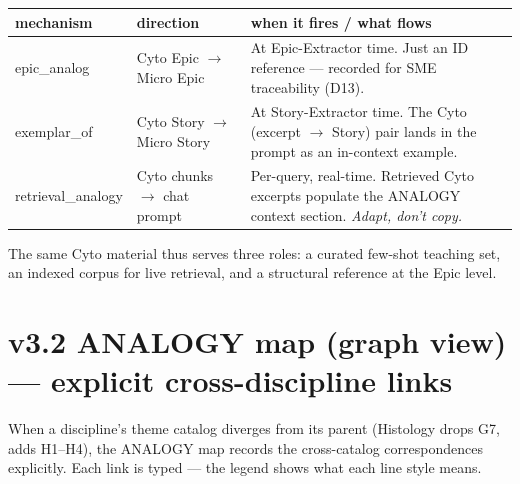 \documentclass[10pt,letterpaper]{article}
\begin{document}
\begin{tabularx}{\textwidth}{@{}>{\ttfamily}p{3.0cm}p{4.0cm}X@{}}
\toprule
\textbf{mechanism} & \textbf{direction} & \textbf{when it fires / what flows} \\
\midrule
epic\_analog & Cyto Epic $\rightarrow$ Micro Epic & At Epic-Extractor time. Just an ID reference --- recorded for SME traceability (D13). \\
exemplar\_of & Cyto Story $\rightarrow$ Micro Story & At Story-Extractor time. The Cyto (excerpt $\rightarrow$ Story) pair lands in the prompt as an in-context example. \\
retrieval\_analogy & Cyto chunks $\rightarrow$ chat prompt & Per-query, real-time. Retrieved Cyto excerpts populate the ANALOGY context section. \emph{Adapt, don't copy.} \\
\bottomrule
\end{tabularx}

The same Cyto material thus serves three roles: a curated few-shot teaching set, an indexed corpus for live retrieval, and a structural reference at the Epic level.

\section{v3.2 ANALOGY map (graph view) --- explicit cross-discipline links}

When a discipline's theme catalog diverges from its parent (Histology drops G7, adds H1--H4), the ANALOGY map records the cross-catalog correspondences explicitly. Each link is typed --- the legend shows what each line style means.
\end{document}
